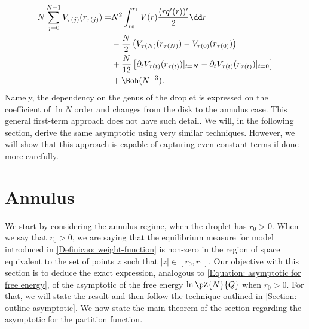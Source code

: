 \begin{align}
		N \sum_{j=0}^{N-1} V_{\tau(j)}(r_{\tau(j)}) = & N^2  \int_{r_0}^{r_1} V(r) \frac{(r q'(r))'}{2} \dd r \\ & - \frac{N}{2} \left( V_{\tau(N)}(r_{\tau(N)})  - V_{\tau(0)}(r_{\tau(0)}) \right)  \\ & + \frac{N}{12} \left[ \partial_t V_{\tau(t)}(r_{\tau(t)}) |_{t=N} - \partial_t V_{\tau(t)}(r_{\tau(t)}) |_{t=0} \right] \\
		& + \Boh(N^{-3}).
\end{align}
Namely, the dependency on the genus of the droplet is expressed on the coefficient of $\ln N$ order and changes from the disk to the annulus case. This general first-term approach does not have such detail. We will, in the following section, derive the same asymptotic using very similar techniques. However, we will show that this approach is capable of capturing even constant terms if done more carefully.

\section{Annulus}
\label{Subsection: Annulus}

We start by considering the annulus regime, when the droplet has $r_0 > 0$. When we say that $r_0 > 0$, we are saying that the equilibrium measure for model introduced in \autoref{Definicao: weight-function} is non-zero in the region of space equivalent to the set of points $z$ such that $|z| \in [r_0, r_1]$. Our objective with this section is to deduce the exact expression, analogous to \eqref{Equation: asymptotic for free energy}, of the asymptotic of the free energy $\ln{\pZ{N}{Q}}$ when $r_0 > 0$. For that, we will state the result and then follow the technique outlined in \autoref{Section: outline asymptotic}. We now state the main theorem of the section regarding the asymptotic for the partition function.

